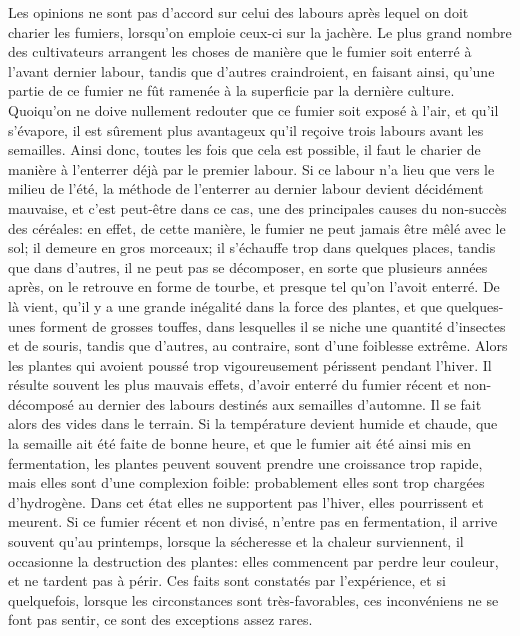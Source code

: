 Les opinions ne sont pas d’accord sur celui des labours après lequel on doit charier les fumiers, lorsqu’on emploie ceux-ci sur la jachère. Le plus grand nombre des cultivateurs arrangent les choses de manière que le fumier soit enterré à l’avant dernier labour, tandis que d’autres craindroient, en faisant ainsi, qu’une partie de ce fumier ne fût ramenée à la superficie par la dernière culture. Quoiqu’on ne doive nullement redouter que ce fumier soit exposé à l’air, et qu’il s’évapore, il est sûrement plus avantageux qu’il reçoive trois labours avant les semailles. Ainsi donc, toutes les fois que cela est possible, il faut le charier de manière à l’enterrer déjà par le premier labour. Si ce labour n’a lieu que vers le milieu de\setcounter{page}{41} l'été, la méthode de l'enterrer au dernier labour devient décidément mauvaise, et c'est peut-être dans ce cas, une des principales causes du non-succès des céréales: en effet, de cette manière, le fumier ne peut jamais être mêlé avec le sol; il demeure en gros morceaux; il s'échauffe trop dans quelques places, tandis que dans d'autres, il ne peut pas se décomposer, en sorte que plusieurs années après, on le retrouve en forme de tourbe, et presque tel qu'on l'avoit enterré. De là vient, qu'il y a une grande inégalité dans la force des plantes, et que quelques-unes forment de grosses touffes, dans lesquelles il se niche une quantité d'insectes et de souris, tandis que d'autres, au contraire, sont d'une foiblesse extrême. Alors les plantes qui avoient poussé trop vigoureusement périssent pendant l'hiver. Il résulte souvent les plus mauvais effets, d'avoir enterré du fumier récent et non-décomposé au dernier des labours destinés aux semailles d'automne. Il se fait alors des vides dans le terrain. Si la température devient humide et chaude, que la semaille ait été faite de bonne heure, et que le fumier ait été ainsi mis en fermentation, les plantes peuvent souvent prendre une croissance trop rapide, mais elles sont d'une complexion foible: probablement elles\setcounter{page}{42} sont trop chargées d'hydrogène. Dans cet état elles ne supportent pas l'hiver, elles pourrissent et meurent. Si ce fumier récent et non divisé, n'entre pas en fermentation, il arrive souvent qu'au printemps, lorsque la sécheresse et la chaleur surviennent, il occasionne la destruction des plantes: elles commencent par perdre leur couleur, et ne tardent pas à périr. Ces faits sont constatés par l'expérience, et si quelquefois, lorsque les circonstances sont très-favorables, ces inconvéniens ne se font pas sentir, ce sont des exceptions assez rares.
